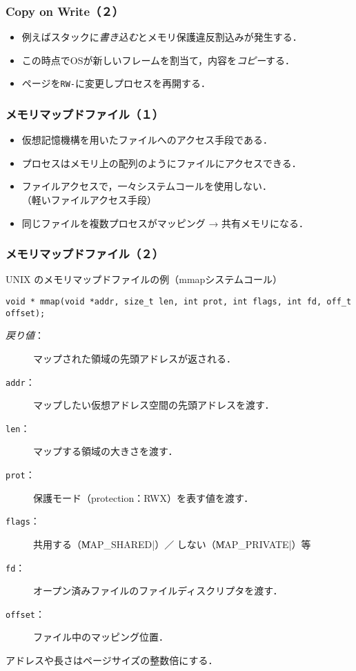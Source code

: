 \documentclass[handout]{beamer}                   %
\begin{document}
\begin{frame}
  \frametitle{Copy on Write（２）}
  \begin{itemize}
  \item 例えばスタックに\emph{書き込む}とメモリ保護違反割込みが発生する．
  \item この時点でOSが新しいフレームを割当て，内容を\emph{コピー}する．
  \item ページを\texttt{RW-}に変更しプロセスを再開する．
  \end{itemize}
\end{frame}

\begin{frame}
  \frametitle{メモリマップドファイル（１）}
  \begin{itemize}
  \item 仮想記憶機構を用いたファイルへのアクセス手段である．
  \item プロセスはメモリ上の配列のようにファイルにアクセスできる．
  \item ファイルアクセスで，一々システムコールを使用しない．\\
    （軽いファイルアクセス手段）
  \item 同じファイルを複数プロセスがマッピング → 共有メモリになる．
  \end{itemize}
\end{frame}

\begin{frame}[fragile]
  \frametitle{メモリマップドファイル（２）}
  UNIX のメモリマップドファイルの例（mmapシステムコール）

\begin{lstlisting}[numbers=none]
void * mmap(void *addr, size_t len, int prot, int flags, int fd, off_t offset);
\end{lstlisting}

  \begin{description}
  \item[\emph{戻り値}：] マップされた領域の先頭アドレスが返される．
  \item[\texttt{addr}：] マップしたい仮想アドレス空間の先頭アドレスを渡す．
  \item[\texttt{len}：] マップする領域の大きさを渡す．
  \item[\texttt{prot}：] 保護モード（protection：RWX）を表す値を渡す．
  \item[\texttt{flags}：]共用する（\|MAP_SHARED|）／
    しない（\|MAP_PRIVATE|）等
  \item[\texttt{fd}：] オープン済みファイルのファイルディスクリプタを渡す．
  \item[\texttt{offset}：] ファイル中のマッピング位置．
  \end{description}

  アドレスや長さはページサイズの整数倍にする．
\end{frame}
\end{document}
